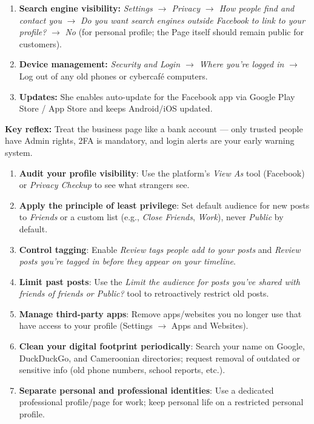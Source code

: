 \documentclass[11pt]{article}
\begin{document}
\begin{exoresolu}
\begin{enumerate}
        \item \textbf{Search engine visibility:} \textit{Settings $\rightarrow$ Privacy $\rightarrow$ How people find and contact you} $\rightarrow$ \textit{Do you want search engines outside Facebook to link to your profile?} $\rightarrow$ \textit{No} (for personal profile; the Page itself should remain public for customers).
        \item \textbf{Device management:} \textit{Security and Login $\rightarrow$ Where you're logged in} $\rightarrow$ Log out of any old phones or cybercafé computers.
        \item \textbf{Updates:} She enables auto-update for the Facebook app via Google Play Store / App Store and keeps Android/iOS updated.
    \end{enumerate}
    \textbf{Key reflex:} Treat the business page like a bank account — only trusted people have Admin rights, 2FA is mandatory, and login alerts are your early warning system.
\end{exoresolu}

\begin{methode}
\begin{enumerate}
    \item \textbf{Audit your profile visibility}: Use the platform's \textit{View As} tool (Facebook) or \textit{Privacy Checkup} to see what strangers see.
    \item \textbf{Apply the principle of least privilege}: Set default audience for new posts to \textit{Friends} or a custom list (e.g., \textit{Close Friends}, \textit{Work}), never \textit{Public} by default.
    \item \textbf{Control tagging}: Enable \textit{Review tags people add to your posts} and \textit{Review posts you're tagged in before they appear on your timeline}.
    \item \textbf{Limit past posts}: Use the \textit{Limit the audience for posts you've shared with friends of friends or Public?} tool to retroactively restrict old posts.
    \item \textbf{Manage third-party apps}: Remove apps/websites you no longer use that have access to your profile (Settings $\rightarrow$ Apps and Websites).
    \item \textbf{Clean your digital footprint periodically}: Search your name on Google, DuckDuckGo, and Cameroonian directories; request removal of outdated or sensitive info (old phone numbers, school reports, etc.).
    \item \textbf{Separate personal and professional identities}: Use a dedicated professional profile/page for work; keep personal life on a restricted personal profile.
\end{enumerate}
\end{methode}
\end{document}
